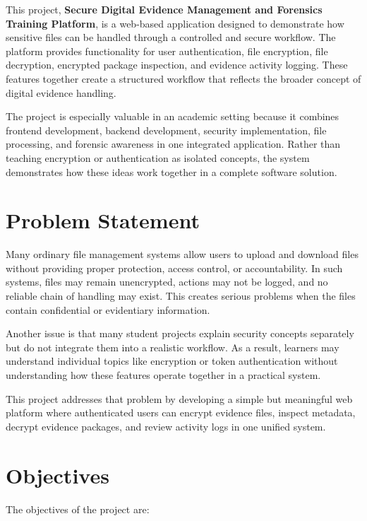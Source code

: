 \documentclass[12pt,a4paper]{report}
\begin{document}
This project, \textbf{Secure Digital Evidence Management and Forensics Training Platform}, is a web-based application designed to demonstrate how sensitive files can be handled through a controlled and secure workflow. The platform provides functionality for user authentication, file encryption, file decryption, encrypted package inspection, and evidence activity logging. These features together create a structured workflow that reflects the broader concept of digital evidence handling.

The project is especially valuable in an academic setting because it combines frontend development, backend development, security implementation, file processing, and forensic awareness in one integrated application. Rather than teaching encryption or authentication as isolated concepts, the system demonstrates how these ideas work together in a complete software solution.

\section{Problem Statement}
Many ordinary file management systems allow users to upload and download files without providing proper protection, access control, or accountability. In such systems, files may remain unencrypted, actions may not be logged, and no reliable chain of handling may exist. This creates serious problems when the files contain confidential or evidentiary information.

Another issue is that many student projects explain security concepts separately but do not integrate them into a realistic workflow. As a result, learners may understand individual topics like encryption or token authentication without understanding how these features operate together in a practical system.

This project addresses that problem by developing a simple but meaningful web platform where authenticated users can encrypt evidence files, inspect metadata, decrypt evidence packages, and review activity logs in one unified system.

\section{Objectives}
The objectives of the project are:
\end{document}

